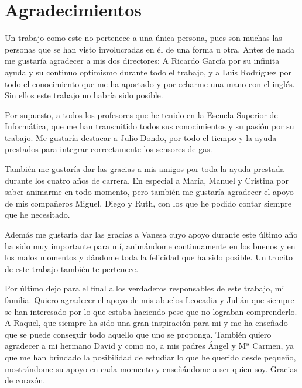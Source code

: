 \chapter{Agradecimientos} %

Un trabajo como este no pertenece a una única persona, pues son muchas las personas que se han visto involucradas en él de una forma u otra. Antes de nada me gustaría agradecer a mis dos directores: A Ricardo García por su infinita ayuda y su continuo optimismo durante todo el trabajo, y a Luis Rodríguez por todo el conocimiento que me ha aportado y por echarme una mano con el inglés. Sin ellos este trabajo no habría sido posible.

Por supuesto, a todos los profesores que he tenido en la Escuela Superior de Informática, que me han transmitido todos sus conocimientos y su pasión por su trabajo. Me gustaría destacar a Julio Dondo, por todo el tiempo y la ayuda prestados para integrar correctamente los sensores de gas. 

También me gustaría dar las gracias a mis amigos por toda la ayuda prestada durante los cuatro años de carrera. En especial a María, Manuel y Cristina por saber animarme en todo momento, pero también me gustaría agradecer el apoyo de mis compañeros Miguel, Diego y Ruth, con los que he podido contar siempre que he necesitado.

Además me gustaría dar las gracias a Vanesa cuyo apoyo durante este último año ha sido muy importante para mí, animándome continuamente en los buenos y en los malos momentos y dándome toda la felicidad que ha sido posible. Un trocito de este trabajo también te pertenece.

Por último dejo para el final a los verdaderos responsables de este trabajo, mi familia. Quiero agradecer el apoyo de mis abuelos Leocadia y Julián que siempre se han interesado por lo que estaba haciendo pese que no lograban comprenderlo. A Raquel, que siempre ha sido una gran inspiración para mi y me ha enseñado que se puede conseguir todo aquello que uno se proponga. También quiero agradecer a mi hermano David y como no, a mis padres Ángel y Mª Carmen, ya que me han brindado la posibilidad de estudiar lo que he querido desde pequeño, mostrándome su apoyo en cada momento y enseñándome a ser quien soy. Gracias de corazón.

